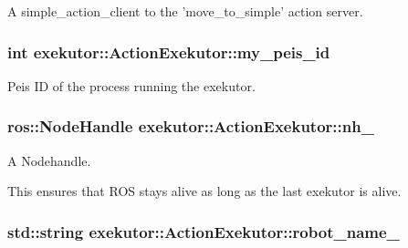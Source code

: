 \-A simple\-\_\-action\-\_\-client to the 'move\-\_\-to\-\_\-simple' action server. 

\hypertarget{classexekutor_1_1ActionExekutor_a31644a88e4d0166c2d3a70bab9eb5b99}{
\subsubsection[{my\-\_\-peis\-\_\-id}]{\setlength{\rightskip}{0pt plus 5cm}int {\bf exekutor\-::\-Action\-Exekutor\-::my\-\_\-peis\-\_\-id}}}\label{classexekutor_1_1ActionExekutor_a31644a88e4d0166c2d3a70bab9eb5b99}


\-Peis \-I\-D of the process running the exekutor. 

\hypertarget{classexekutor_1_1ActionExekutor_a1f0541608c4f27f3c72ab22b1874c882}{
\subsubsection[{nh\-\_\-}]{\setlength{\rightskip}{0pt plus 5cm}ros\-::\-Node\-Handle {\bf exekutor\-::\-Action\-Exekutor\-::nh\-\_\-}}}\label{classexekutor_1_1ActionExekutor_a1f0541608c4f27f3c72ab22b1874c882}


\-A \-Nodehandle. 

\-This ensures that \-R\-O\-S stays alive as long as the last exekutor is alive. \hypertarget{classexekutor_1_1ActionExekutor_af165894bbbbabd62c17be857be095936}{
\subsubsection[{robot\-\_\-name\-\_\-}]{\setlength{\rightskip}{0pt plus 5cm}std\-::string {\bf exekutor\-::\-Action\-Exekutor\-::robot\-\_\-name\-\_\-}}}\label{classexekutor_1_1ActionExekutor_af165894bbbbabd62c17be857be095936}


